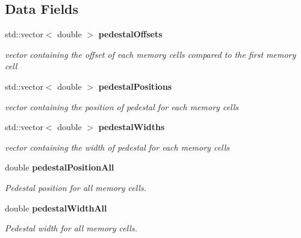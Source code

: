 \subsection*{Data Fields}
\begin{DoxyCompactItemize}
\item 
std::vector$<$ double $>$ {\bf pedestalOffsets}\label{classCALICE_1_1Ahc2PedestalCalibrator_1_1PedestalSpectrum_a05e78cb9b9717d1ac7c2b905ddc6ab9f}

\begin{DoxyCompactList}\small\item\em vector containing the offset of each memory cells compared to the first memory cell \item\end{DoxyCompactList}\item 
std::vector$<$ double $>$ {\bf pedestalPositions}\label{classCALICE_1_1Ahc2PedestalCalibrator_1_1PedestalSpectrum_a86f9afd5754e127d8cd23cd92beef702}

\begin{DoxyCompactList}\small\item\em vector containing the position of pedestal for each memory cells \item\end{DoxyCompactList}\item 
std::vector$<$ double $>$ {\bf pedestalWidths}\label{classCALICE_1_1Ahc2PedestalCalibrator_1_1PedestalSpectrum_ab85bc6de877015ebc9a7a50e462573a1}

\begin{DoxyCompactList}\small\item\em vector containing the width of pedestal for each memory cells \item\end{DoxyCompactList}\item 
double {\bf pedestalPositionAll}\label{classCALICE_1_1Ahc2PedestalCalibrator_1_1PedestalSpectrum_a3cd2f8ae912bb2f5945b960a4328c962}

\begin{DoxyCompactList}\small\item\em Pedestal position for all memory cells. \item\end{DoxyCompactList}\item 
double {\bf pedestalWidthAll}\label{classCALICE_1_1Ahc2PedestalCalibrator_1_1PedestalSpectrum_a46ee3c76b98aa250608c7088b5701f1b}

\begin{DoxyCompactList}\small\item\em Pedestal width for all memory cells. \item\end{DoxyCompactList}\end{DoxyCompactItemize}
